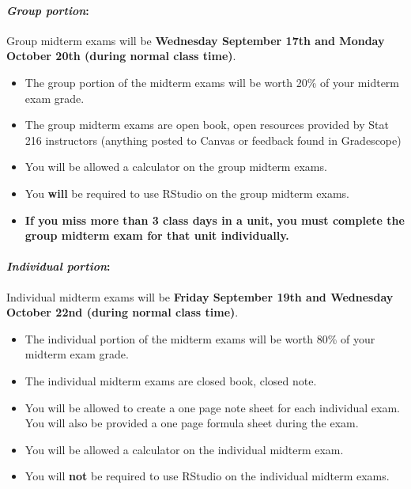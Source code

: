 \documentclass[
]{article}
\providecommand{\tightlist}{%
  \setlength{\itemsep}{0pt}\setlength{\parskip}{0pt}}
\begin{document}
\paragraph{\texorpdfstring{\emph{Group
portion}:}{Group portion:}}\label{group-portion}

Group midterm exams will be \textbf{Wednesday September 17th and Monday
October 20th (during normal class time)}.

\begin{itemize}
\tightlist
\item
  The group portion of the midterm exams will be worth 20\% of your
  midterm exam grade.
\item
  The group midterm exams are open book, open resources provided by Stat
  216 instructors (anything posted to Canvas or feedback found in
  Gradescope)
\item
  You will be allowed a calculator on the group midterm exams.
\item
  You \textbf{will} be required to use RStudio on the group midterm
  exams.
\item
  \textbf{If you miss more than 3 class days in a unit, you must
  complete the group midterm exam for that unit individually.}
\end{itemize}

\paragraph{\texorpdfstring{\emph{Individual
portion}:}{Individual portion:}}\label{individual-portion}

Individual midterm exams will be \textbf{Friday September 19th and
Wednesday October 22nd (during normal class time)}.

\begin{itemize}
\tightlist
\item
  The individual portion of the midterm exams will be worth 80\% of your
  midterm exam grade.
\item
  The individual midterm exams are closed book, closed note.
\item
  You will be allowed to create a one page note sheet for each
  individual exam. You will also be provided a one page formula sheet
  during the exam.
\item
  You will be allowed a calculator on the individual midterm exam.
\item
  You will \textbf{not} be required to use RStudio on the individual
  midterm exams.
\end{itemize}
\end{document}
